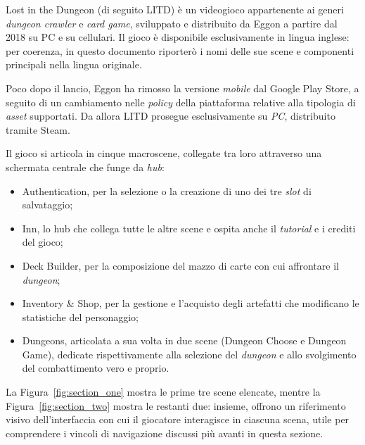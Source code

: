  
Lost in the Dungeon (di seguito LITD) è un videogioco appartenente ai generi \textit{dungeon crawler} e \textit{card game}, sviluppato e distribuito da Eggon a partire dal 2018 su PC e su cellulari. Il gioco è disponibile esclusivamente in lingua inglese: per coerenza, in questo documento riporterò i nomi delle sue scene e componenti principali nella lingua originale.
 
Poco dopo il lancio, Eggon ha rimosso la versione \textit{mobile} dal Google Play Store, a seguito di un cambiamento nelle \textit{policy} della piattaforma relative alla tipologia di \textit{asset} supportati. Da allora LITD prosegue esclusivamente su \textit{PC}, distribuito tramite Steam.
 
Il gioco si articola in cinque macroscene, collegate tra loro attraverso una schermata centrale che funge da \textit{hub}:
 
\begin{itemize}
    \item Authentication, per la selezione o la creazione di uno dei tre \textit{slot} di salvataggio;
    \item Inn, lo hub che collega tutte le altre scene e ospita anche il \textit{tutorial} e i crediti del gioco;
    \item Deck Builder, per la composizione del mazzo di carte con cui affrontare il \textit{dungeon};
    \item Inventory \& Shop, per la gestione e l'acquisto degli artefatti che modificano le statistiche del personaggio;
    \item Dungeons, articolata a sua volta in due scene (Dungeon Choose e Dungeon Game), dedicate rispettivamente alla selezione del \textit{dungeon} e allo svolgimento del combattimento vero e proprio.
\end{itemize}
 
La Figura~\ref{fig:section_one} mostra le prime tre scene elencate, mentre la Figura~\ref{fig:section_two} mostra le restanti due: insieme, offrono un riferimento visivo dell'interfaccia con cui il giocatore interagisce in ciascuna scena, utile per comprendere i vincoli di navigazione discussi più avanti in questa sezione.
 
